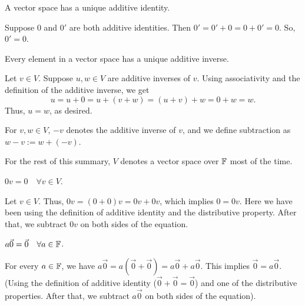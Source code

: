 \setcounter{thm}{25}
\begin{thm} 
  \label{thm: unique additive identity}
  A vector space has a unique additive identity.
\end{thm}
\begin{prf}
  Suppose $0$ and $0'$ are both additive identities. Then $0' = 0'+ 0 = 0 + 0' = 0$. So, $0' = 0$.
\end{prf}

\begin{thm} 
  \label{thm: unique additive inverse}
  Every element in a vector space has a unique additive inverse.
\end{thm}
\begin{prf}
  Let $v\in V$. Suppose $u,w \in V$ are additive inverses of $v$. Using associativity and the definition of the additive inverse, we get
  \begin{equation}
    u = u + 0 = u + (v + w) = (u+v) + w = 0 + w = w.
  \end{equation}
  Thus, $u = w$, as desired.
\end{prf}

\begin{mydef}
  For $v,w\in V$, $-v$ denotes the additive inverse of $v$, and we define subtraction as $w-v := w+(-v)$.
\end{mydef}

\begin{mydef}
  For the rest of this summary, $V$ denotes a vector space over $\mathbb{F}$ most of the time.
\end{mydef}

\begin{thm} 
  \label{thm: zero times a vector}
  $0v = 0 \quad \forall v\in V$.
\end{thm}
\begin{prf}
  Let $v \in V$. Thus, $0v = (0+0)v = 0v + 0v$, which implies $0 = 0v$. Here we have been using the definition of additive identity and the distributive property. After that, we subtract $0v$ on both sides of the equation.
\end{prf}

\begin{thm} 
  \label{thm: a number times the vector zero}
  $a \vec0 = \vec0 \quad \forall a\in \mathbb{F}$.
\end{thm}
\begin{prf}
  For every $a \in \mathbb{F}$, we have $a\vec0 = a(\vec0+\vec0) = a\vec0 + a\vec0$. This implies $\vec0 = a\vec0$. (Using the definition of additive identity ($\vec0+\vec0=\vec0$) and one of the distributive properties. After that, we subtract $a\vec0$ on both sides of the equation).
\end{prf}

